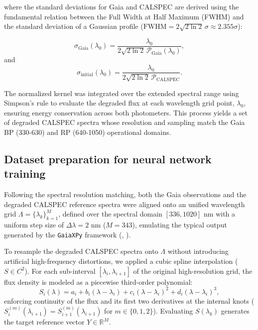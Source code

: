\documentclass{aa}
\begin{document}
\noindent where the standard deviations for Gaia and CALSPEC are derived using the fundamental relation between the Full Width at Half Maximum (FWHM) and the standard deviation of a Gaussian profile ($\text{FWHM} = 2\sqrt{2\ln 2}\,\sigma \approx 2.355\sigma$):

\begin{equation}
\sigma_{\text{Gaia}}(\lambda_0) = \frac{\lambda_0}{2\sqrt{2 \ln{2}} \, \mathcal{P}_{\text{Gaia}}(\lambda_0)},
\end{equation}
and
\begin{equation}
\sigma_{\text{initial}}(\lambda_0) = \frac{\lambda_0}{2\sqrt{2 \ln{2}} \, \mathcal{P}_{\text{CALSPEC}}}.
\end{equation}

The normalized kernel was integrated over the extended spectral range using Simpson's rule to evaluate the degraded flux at each wavelength grid point, $\lambda_0$, ensuring energy conservation across both photometers. This process yields a set of degraded CALSPEC spectra whose resolution and sampling match the Gaia BP (330-630) and RP (640-1050) operational domains.


\subsection{Dataset preparation for neural network training}

Following the spectral resolution matching, both the Gaia observations and the degraded CALSPEC reference spectra were aligned onto an unified wavelength grid $\Lambda = \{\lambda_k\}_{k=1}^{M}$, defined over the spectral domain $[336, 1020]\text{ nm}$ with a uniform step size of $\Delta\lambda = 2\text{ nm}$ ($M = 343$), emulating the typical output generated by the \texttt{GaiaXPy} framework (\citealt{de_angeli_2023}, \citealt{gaiaxpy_2022}).

To resample the degraded CALSPEC spectra onto $\Lambda$ without introducing artificial high-frequency distortions, we applied a cubic spline interpolation ($S \in C^2$). For each sub-interval $[\lambda_i, \lambda_{i+1}]$ of the original high-resolution grid, the flux density is modeled as a piecewise third-order polynomial:
\begin{equation}
    S_i(\lambda) = a_i + b_i(\lambda - \lambda_i) + c_i(\lambda - \lambda_i)^2 + d_i(\lambda - \lambda_i)^3,
\end{equation}
enforcing continuity of the flux and its first two derivatives at the internal knots ($S_i^{(m)}(\lambda_{i+1}) = S_{i+1}^{(m)}(\lambda_{i+1})$ for $m \in \{0, 1, 2\}$). Evaluating $S(\lambda_k)$ generates the target reference vector $Y \in \mathbb{R}^M$.
\end{document}
